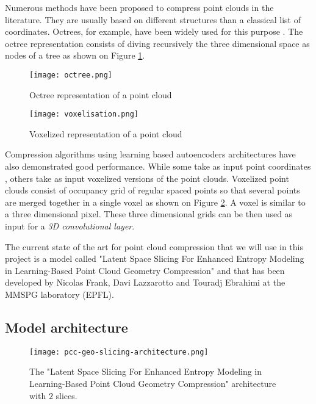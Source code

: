 \label{sec:pcc}

Numerous methods have been proposed to compress point clouds in the literature. They are usually based on different structures than a classical list of coordinates.                                
Octrees, for example, have been widely used for this purpose \cite{bib:octree}. 
The octree representation consists of diving recursively the three dimensional space as nodes of a tree as shown on Figure \ref{fig:octree}.

\begin{figure}
    \centering
    \texttt{[image: octree.png]}
    \caption{Octree representation of a point cloud}
    \label{fig:octree}
\end{figure}

\begin{figure}
    \centering
    \texttt{[image: voxelisation.png]}
    \caption{Voxelized representation of a point cloud}
    \label{fig:voxelized}
\end{figure}

Compression algorithms using learning based autoencoders architectures have also demonstrated good performance. While some take as input point coordinates \cite{bib:9102866}, others take as input voxelized versions of the point clouds. 
Voxelized point clouds consist of occupancy grid of regular spaced points so that several points are merged together in a single voxel as shown on Figure \ref{fig:voxelized}.
A voxel is similar to a three dimensional pixel.
These three dimensional grids can be then used as input for a \textit{3D convolutional layer}.


The current state of the art for point cloud compression that we will use in this project is a model called "Latent Space Slicing For Enhanced Entropy Modeling in Learning-Based Point Cloud Geometry Compression" and that has been developed by Nicolas Frank, Davi Lazzarotto and Touradj Ebrahimi at the MMSPG laboratory (EPFL).

\subsection{Model architecture}
\label{subsec:model-architecture}

\begin{figure}
    \centering
    \texttt{[image: pcc-geo-slicing-architecture.png]}
    \caption{The "Latent Space Slicing For Enhanced Entropy Modeling in Learning-Based Point Cloud Geometry Compression" architecture with $2$ slices.}
    \label{fig:pcc-geo-slicing-architecture}
\end{figure}

